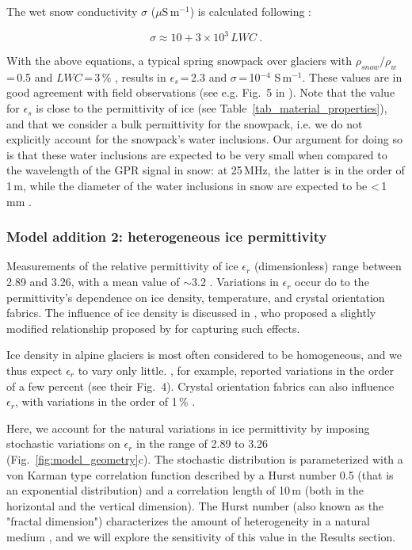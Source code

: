 The wet snow conductivity $\sigma$ ($\mu$S\,m$^{-1}$) is calculated following \cite{Granlund&al2010}:

\begin{equation}
    \sigma \approx  10 + 3\times10^3\,LWC~.
    \label{eq:sigma_wet_snow}
\end{equation}

With the above equations, a typical spring snowpack over glaciers with $\rho_{snow}/\rho_w$\,=\,0.5 and $LWC$\,=\,3\,\% \citep{Griessinger&al2018}, results in $\epsilon_s$\,=\,2.3 and $\sigma$\,=\,10$^{-4}$ S\,m$^{-1}$. These values are in good agreement with field observations (see e.g. Fig.~5 in \cite{Evans1965}). Note that the value for $\epsilon_s$ is close to the permittivity of ice (see Table~\ref{tab_material_properties}), and that we consider a bulk permittivity for the snowpack, i.e. we do not explicitly account for the snowpack's water inclusions. Our argument for doing so is that these water inclusions are expected to be very small when compared to the wavelength of the GPR signal in snow: at 25\,MHz, the latter is in the order of 1\,m, while the diameter of the water inclusions in snow are expected to be <\,1\,mm \citep[e.g.][]{Coleou&al2001}.  

\subsubsection{Model addition 2: heterogeneous ice permittivity}
\label{sec:stoch_mod}

Measurements of the relative permittivity of ice $\epsilon_r$ (dimensionless) range between 2.89 and 3.26, with a mean value of $\sim$3.2 \citep{Reynolds2011, Johari&Charette1975, Robin&al1969, Plewes&Hubbard2001, Bohleber2012, Jezek&al1978}. Variations in  $\epsilon_r$ occur do to the permittivity's dependence on ice density, temperature, and crystal orientation fabrics. The influence of ice density is discussed in \cite{Kovacs&al1995}, who proposed a slightly modified relationship proposed by \cite{Robin&al1969} for capturing such effects. 

Ice density in alpine glaciers is most often considered to be homogeneous, and we thus expect $\epsilon_r$ to vary only little. \citet{Bohleber2012}, for example, reported variations in the order of a few percent (see their Fig.~4). Crystal orientation fabrics can also influence $\epsilon_r$, with variations in the order of 1\,\% \citep{Johari&Charette1975,Fujita&al1993}.

Here, we account for the natural variations in ice permittivity by imposing stochastic variations on $\epsilon_r$ in the range of 2.89 to 3.26 (Fig.~\ref{fig:model_geometry}c). The stochastic distribution is parameterized with a von Karman type correlation function \citep{Goff&Holliger2012} described by a Hurst number 0.5 (that is an exponential distribution) and a correlation length of 10\,m (both in the horizontal and the vertical dimension). The Hurst number (also known as the "fractal dimension") characterizes the amount of heterogeneity in a natural medium \citep{Goff&Holliger2012}, and we will explore the sensitivity of this value in the Results section.


